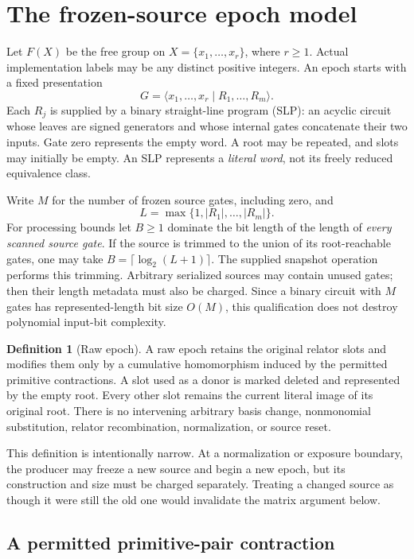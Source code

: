 \documentclass[11pt,letterpaper]{article}
\theoremstyle{definition}
\newtheorem{definition}[theorem]{Definition}
\theoremstyle{remark}\newtheorem{remark}[theorem]{Remark}
\begin{document}
\section{The frozen-source epoch model}
\label{sec:model}

Let $F(X)$ be the free group on $X=\{x_1,\ldots,x_r\}$, where $r\ge1$.
Actual implementation labels may be any distinct positive integers. An epoch
starts with a fixed presentation
\[
 G=\langle x_1,\ldots,x_r\mid R_1,\ldots,R_m\rangle.
\]
Each $R_j$ is supplied by a binary straight-line program (SLP): an acyclic
circuit whose leaves are signed generators and whose internal gates
concatenate their two inputs. Gate zero represents the empty word. A root
may be repeated, and slots may initially be empty. An SLP represents a
\emph{literal word}, not its freely reduced equivalence class.

Write $M$ for the number of frozen source gates, including zero, and
\[
 L=\max\{1,|R_1|,\ldots,|R_m|\}.
\]
For processing bounds let $B\ge1$ dominate the bit length of the length of
\emph{every scanned source gate}. If the source is trimmed to the union of
its root-reachable gates, one may take
$B=\lceil\log_2(L+1)\rceil$. The supplied snapshot operation performs this
trimming. Arbitrary serialized sources may contain unused gates; then their
length metadata must also be charged. Since a binary circuit with $M$ gates
has represented-length bit size $O(M)$, this qualification does not destroy
polynomial input-bit complexity.

\begin{definition}[Raw epoch]
A raw epoch retains the original relator slots and modifies them only by a
cumulative homomorphism induced by the permitted primitive contractions.
A slot used as a donor is marked deleted and represented by the empty root.
Every other slot remains the current literal image of its original root.
There is no intervening arbitrary basis change, nonmonomial substitution,
relator recombination, normalization, or source reset.
\end{definition}

This definition is intentionally narrow. At a normalization or exposure
boundary, the producer may freeze a new source and begin a new epoch, but
its construction and size must be charged separately. Treating a changed
source as though it were still the old one would invalidate the matrix
argument below.

\subsection{A permitted primitive-pair contraction}
\end{document}
